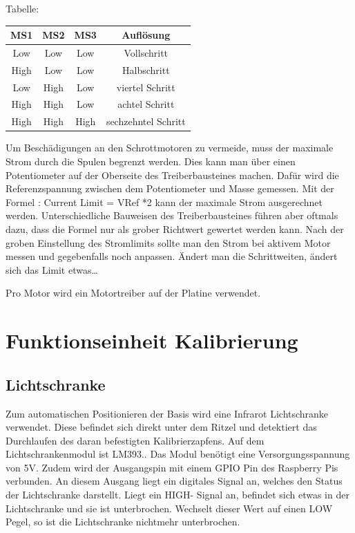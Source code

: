 Tabelle:

\begin{center}
	\begin{tabular} [H] {|c|c|c|c|}
		\hline
		\textbf{MS1} & \textbf{MS2}	& \textbf{MS3} 		& \textbf{Auflösung} \\ \hline
		Low & Low	& Low		& Vollschritt\\ \hline
		High & Low 	& Low  		& Halbschritt	\\ \hline
		Low & High  & Low 		& viertel Schritt 	\\ \hline
		High & High	& Low 		& achtel Schritt 	\\ \hline
		High & High	 &  High	& sechzehntel Schritt	\\\hline
	
		\end {tabular}
		\label{Mikrostepping}
	\end{center}



Um Beschädigungen an den Schrottmotoren zu vermeide, muss der maximale Strom durch die Spulen begrenzt werden. Dies kann man über einen Potentiometer auf der Oberseite des Treiberbausteines machen. Dafür wird die Referenzspannung zwischen dem Potentiometer und Masse gemessen. Mit der Formel : Current Limit = VRef *2 kann der maximale Strom ausgerechnet werden.
Unterschiedliche Bauweisen des Treiberbausteines führen aber oftmals dazu, dass die Formel nur als grober Richtwert gewertet werden kann. Nach der groben Einstellung des Stromlimits sollte man den Strom bei aktivem Motor messen und gegebenfalls noch anpassen.
Ändert man die Schrittweiten, ändert sich das Limit etwas…

Pro Motor wird ein Motortreiber auf der Platine verwendet.



\section{Funktionseinheit Kalibrierung}

\subsection{Lichtschranke}
Zum automatischen Positionieren der Basis wird eine Infrarot Lichtschranke verwendet. Diese befindet sich direkt unter dem Ritzel und detektiert das Durchlaufen des daran befestigten Kalibrierzapfens.
Auf dem Lichtschrankenmodul ist LM393..
Das Modul benötigt eine Versorgungsspannung von 5V. Zudem wird der Ausgangspin mit einem GPIO Pin des Raspberry Pis verbunden. An diesem Ausgang liegt ein digitales Signal an, welches den Status der Lichtschranke darstellt. Liegt ein HIGH- Signal an, befindet sich etwas in der Lichtschranke und sie ist unterbrochen. Wechselt dieser Wert auf einen LOW Pegel, so ist die Lichtschranke nichtmehr unterbrochen.

